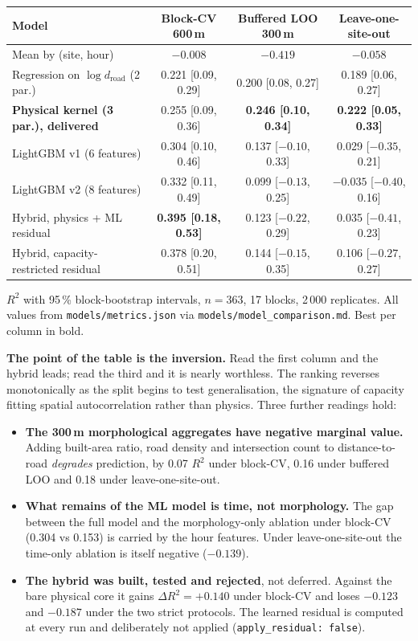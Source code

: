 \documentclass[11pt,a4paper]{article}
\newcommand{\pth}[1]{\texttt{\small #1}}
\begin{document}
\begin{center}\footnotesize
\begin{tabular}{@{}lccc@{}}
\toprule
\textbf{Model} & \textbf{Block-CV 600\,m} & \textbf{Buffered LOO 300\,m} &
\textbf{Leave-one-site-out} \\
\midrule
Mean by (site, hour) & $-0.008$ & $-0.419$ & $-0.058$ \\
Regression on $\log d_{\text{road}}$ (2 par.) & 0.221 [0.09, 0.29] & 0.200 [0.08, 0.27] & 0.189 [0.06, 0.27] \\
\textbf{Physical kernel (3 par.), delivered} & 0.255 [0.09, 0.36] & \textbf{0.246 [0.10, 0.34]} & \textbf{0.222 [0.05, 0.33]} \\
LightGBM v1 (6 features) & 0.304 [0.10, 0.46] & 0.137 [$-0.10$, 0.33] & 0.029 [$-0.35$, 0.21] \\
LightGBM v2 (8 features) & 0.332 [0.11, 0.49] & 0.099 [$-0.13$, 0.25] & $-0.035$ [$-0.40$, 0.16] \\
Hybrid, physics + ML residual & \textbf{0.395 [0.18, 0.53]} & 0.123 [$-0.22$, 0.29] & 0.035 [$-0.41$, 0.23] \\
Hybrid, capacity-restricted residual & 0.378 [0.20, 0.51] & 0.144 [$-0.15$, 0.35] & 0.106 [$-0.27$, 0.27] \\
\bottomrule
\end{tabular}
\end{center}

\noindent\small $R^2$ with 95\,\% block-bootstrap intervals, $n = 363$, 17
blocks, 2\,000 replicates. All values from \pth{models/metrics.json} via
\pth{models/model\_comparison.md}. Best per column in bold.\normalsize

\medskip
\textbf{The point of the table is the inversion.} Read the first column and the
hybrid leads; read the third and it is nearly worthless. The ranking reverses
monotonically as the split begins to test generalisation, the signature of
capacity fitting spatial autocorrelation rather than physics. Three further
readings hold:

\begin{itemize}
 \item \textbf{The 300\,m morphological aggregates have negative marginal
 value.} Adding built-area ratio, road density and intersection count to
 distance-to-road \emph{degrades} prediction, by 0.07 $R^2$ under
 block-CV, 0.16 under buffered LOO and 0.18 under leave-one-site-out.
 \item \textbf{What remains of the ML model is time, not morphology.} The gap
 between the full model and the morphology-only ablation under block-CV
 (0.304 vs 0.153) is carried by the hour features. Under
 leave-one-site-out the time-only ablation is itself negative
 ($-0.139$).
 \item \textbf{The hybrid was built, tested and rejected}, not deferred. Against
 the bare physical core it gains $\Delta R^2 = +0.140$ under block-CV and
 loses $-0.123$ and $-0.187$ under the two strict protocols. The learned
 residual is computed at every run and deliberately not applied
 (\pth{apply\_residual: false}).
\end{itemize}
\end{document}
